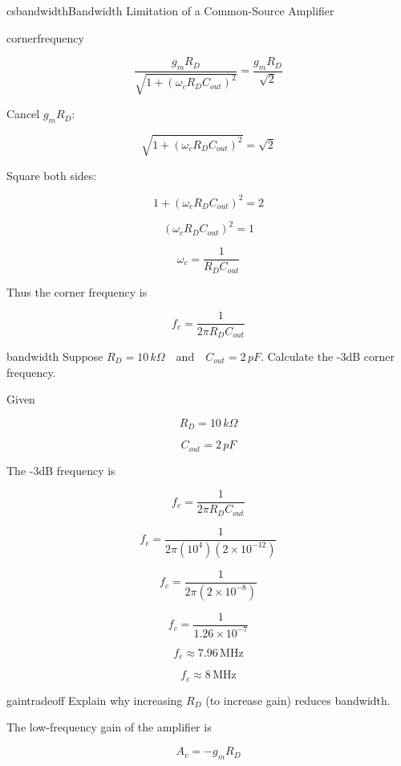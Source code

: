 \begin{mainquestion}{csbandwidth}{Bandwidth Limitation of a Common-Source Amplifier}
\begin{partquestion}{cornerfrequency}
\begin{answer}[2.5in]
\[
\frac{g_m R_D}
{\sqrt{1+(\omega_c R_D C_{out})^2}}
=
\frac{g_m R_D}{\sqrt{2}}
\]

Cancel \(g_m R_D\):

\[
\sqrt{1+(\omega_c R_D C_{out})^2}
=
\sqrt{2}
\]

Square both sides:

\[
1+(\omega_c R_D C_{out})^2 = 2
\]

\[
(\omega_c R_D C_{out})^2 = 1
\]

\[
\omega_c = \frac{1}{R_D C_{out}}
\]

Thus the corner frequency is

\[
f_c = \frac{1}{2\pi R_D C_{out}}
\]
\end{answer}

\end{partquestion}

\begin{partquestion}{bandwidth}
{Suppose $R_D = 10\,k\Omega
\quad\text{and}\quad
C_{out} = 2\,pF$. Calculate the -3dB corner frequency.}

\begin{answer}[2.5in]
Given

\[
R_D = 10\,k\Omega
\]

\[
C_{out} = 2\,pF
\]

The -3dB frequency is

\[
f_c =
\frac{1}{2\pi R_D C_{out}}
\]

\[
f_c =
\frac{1}{2\pi (10^4)(2\times10^{-12})}
\]

\[
f_c =
\frac{1}{2\pi (2\times10^{-8})}
\]

\[
f_c =
\frac{1}{1.26\times10^{-7}}
\]

\[
f_c \approx 7.96\,\text{MHz}
\]

\[
\boxed{f_c \approx 8\,\text{MHz}}
\]
\end{answer}

\end{partquestion}

\begin{partquestion}{gaintradeoff}
{Explain why increasing \(R_D\) (to increase gain) reduces bandwidth.}

\begin{answer}[2in]
The low-frequency gain of the amplifier is

\[
A_v = -g_m R_D
\]


\end{answer}
\end{partquestion}
\end{mainquestion}
